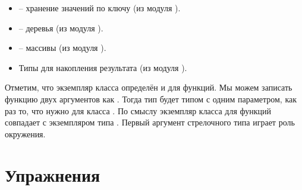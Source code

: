 \begin{itemize}

\item {} -- хранение значений по ключу 
(из модуля ).

\item {} -- деревья (из модуля ).

\item {} -- массивы (из модуля ).

\item Типы для накопления результата (из модуля ).

\end{itemize}

Отметим, что экземпляр класса  определён 
и для функций. Мы можем записать функцию двух аргументов
 как . Тогда тип 
 будет типом с одним параметром, как раз то, что нужно для
класса . По смыслу экземпляр класса  
для функций совпадает с экземпляром типа . 
Первый аргумент стрелочного типа  играет роль окружения.

\section{Упражнения}

